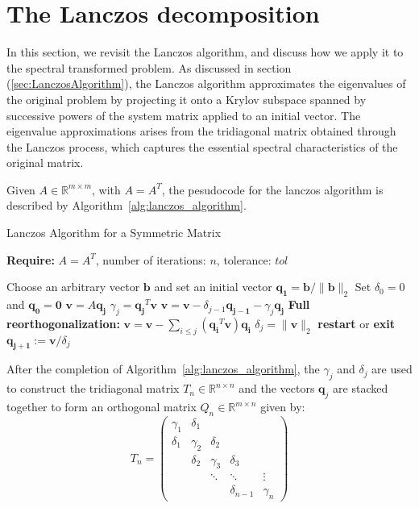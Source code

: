 \section{The Lanczos decomposition}\label{sec:LanczosDecomposition}

In this section, we revisit the Lanczos algorithm, and discuss how we apply it to the spectral transformed problem. As discussed in section (\ref{sec:LanczosAlgorithm}), the Lanczos algorithm approximates the eigenvalues of the original problem by projecting it onto a Krylov subspace spanned by successive powers of the system matrix applied to an initial vector. The eigenvalue approximations arises from the tridiagonal matrix obtained through the Lanczos process, which captures the essential spectral characteristics of the original matrix.

Given $A \in \mathbb{R}^{m \times m}$, with $A=A^T$, the pesudocode for the lanczos algorithm is described by Algorithm~\ref{alg:lanczos_algorithm}.
\begin{algorithm}
	\caption{Lanczos Algorithm for a Symmetric Matrix}
	\label{alg:lanczos_algorithm}

	\textbf{Require:} \( A = A^T \), number of iterations: \(n\), tolerance: \(tol\)
	\begin{algorithmic}[1]
		\State Choose an arbitrary vector $\mathbf{b}$ and set an initial vector $\mathbf{q_1} = \mathbf{b}/ \|\mathbf{b}\|_2$ 
		\State Set $\delta_0 = 0$ and $\mathbf{q_0} = \mathbf{0}$
		\State $\mathbf{v} = A \mathbf{q_j}$
		\State $\gamma_j = \mathbf{q_j}^T \mathbf{v} $
		\State $\mathbf{v} = \mathbf{v} - \delta_{j-1}\mathbf{q_{j-1}} - \gamma_j \mathbf{q_j}$
		\State \textbf{Full reorthogonalization:} $\mathbf{v} = \mathbf{v} - \sum_{i \leq j} (\mathbf{q_i}^T \mathbf{v}) \mathbf{q_i}$
		\State $\delta_{j} = \|\mathbf{v}\|_2$
		\State \textbf{restart} or \textbf{exit}
		\EndIf
		\State $\mathbf{q_{j+1}} := \mathbf{v} / \delta_{j}$
		\EndFor
		\EndFunction
	\end{algorithmic}
\end{algorithm}
After the completion of Algorithm~\ref{alg:lanczos_algorithm}, the $\gamma_j$ and $\delta_j$ are used to construct the tridiagonal matrix $T_n \in \mathbb{R}^{n \times n}$ and the vectors $\mathbf{q}_j$ are stacked together to form an orthogonal matrix $Q_n \in \mathbb{R}^{m \times n}$ given by:
\[T_n = \begin{pmatrix}
			\gamma_1 & \delta_1 & & & \\\delta_1 & \gamma_2 & \delta_2 & & \\ & \delta_2 & \gamma_3 & \delta_3 & \\ & & \ddots & \ddots & \vdots \\ & & & \delta_{n-1} & \gamma_n
		\end{pmatrix}\] 
